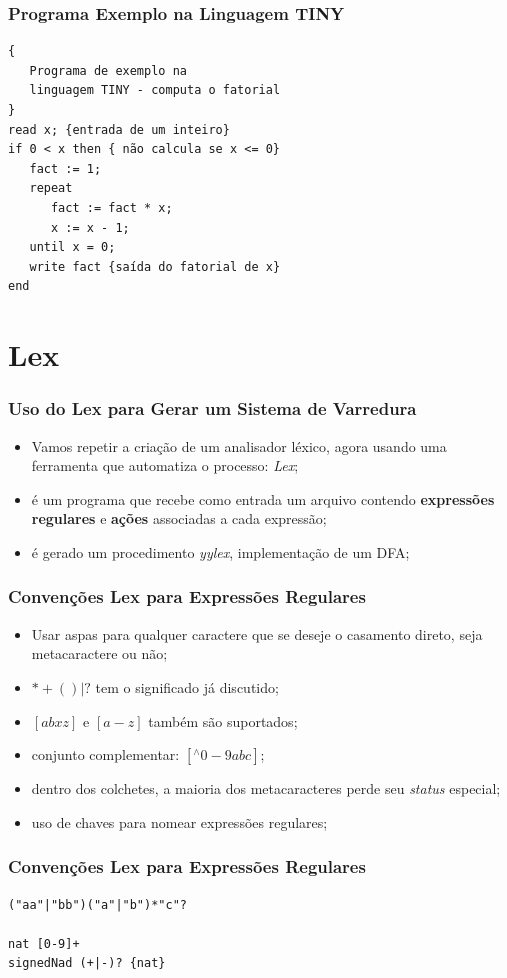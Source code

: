 \documentclass[table]{beamer}
\begin{document}
\begin{frame}[fragile]
   \frametitle{Programa Exemplo na Linguagem TINY}
   \begin{verbatim}
{
   Programa de exemplo na 
   linguagem TINY - computa o fatorial
}
read x; {entrada de um inteiro}
if 0 < x then { não calcula se x <= 0}
   fact := 1;
   repeat
      fact := fact * x;
      x := x - 1;
   until x = 0;
   write fact {saída do fatorial de x}
end
   \end{verbatim}
\end{frame}

\section{Lex}
\begin{frame}
   \frametitle{Uso do Lex para Gerar um Sistema de Varredura}
   \begin{itemize}
      \item Vamos repetir a criação de um analisador léxico, agora usando uma ferramenta que automatiza o processo: \textit{Lex};
      \item é um programa que recebe como entrada um arquivo contendo \textbf{expressões regulares} e \textbf{ações} associadas a cada expressão;
      \item é gerado um procedimento \textit{yylex}, implementação de um DFA;
   \end{itemize}
\end{frame}

\begin{frame}
   \frametitle{Convenções Lex para Expressões Regulares}
   \begin{itemize}
      \item Usar aspas para qualquer caractere que se deseje o casamento direto, seja metacaractere ou não;
      \item $* + ( ) | ?$ tem o significado já discutido;
      \item $[abxz]$ e  $[a-z]$ também são suportados;
      \item conjunto complementar: $[^\wedge0-9abc]$;
      \item dentro dos colchetes, a maioria dos metacaracteres perde seu \textit{status} especial;
      \item uso de chaves para nomear expressões regulares;
   \end{itemize}
\end{frame}

\begin{frame}[fragile]
   \frametitle{Convenções Lex para Expressões Regulares}
   \begin{verbatim}
("aa"|"bb")("a"|"b")*"c"?

nat [0-9]+
signedNad (+|-)? {nat}
   \end{verbatim}
\end{frame}
\end{document}
